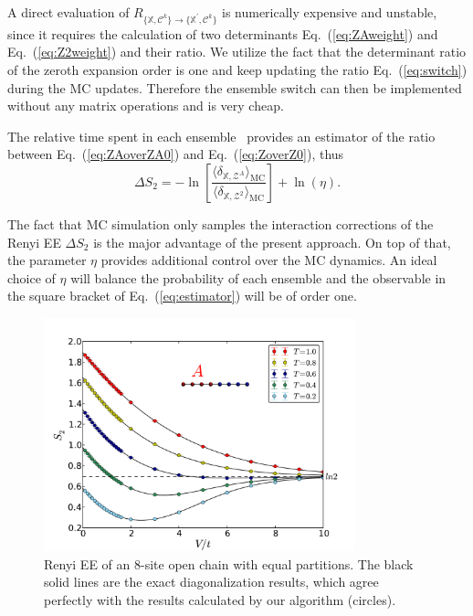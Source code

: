\documentclass[12pt,onecolumn,english,prl,showpacs,nofootinbib]{revtex4-1}
\begin{document}
A direct evaluation of $R_{\{\mathbb{X}, \mathcal{C}^{k}\} \rightarrow \{\mathbb{X}^{\prime}, \mathcal{C}^{k}\}}$ is numerically expensive and unstable, since it requires the calculation of two determinants Eq.~(\ref{eq:ZAweight}) and Eq.~(\ref{eq:Z2weight}) and their ratio. We utilize the fact that the determinant ratio of the zeroth expansion order is one and keep updating the ratio Eq.~(\ref{eq:switch}) during the MC updates. Therefore the ensemble switch can then be implemented without any matrix operations and is very cheap. 

The relative time spent in each ensemble~\cite{Humeniuk:2012cq}  provides an estimator of the ratio between Eq.~(\ref{eq:ZAoverZA0}) and Eq.~(\ref{eq:ZoverZ0}), thus 
\begin{equation}
\Delta S_{2} = -\ln\left [\frac{\langle \delta_{\mathbb{X},\mathcal{Z}^{A}} \rangle_\mathrm{MC}}{ \langle \delta _{\mathbb{X}, \mathcal{Z}^{2}} \rangle_\mathrm{MC}} \right ] + \ln(\eta).
\label{eq:estimator}
\end{equation}

The fact that MC simulation only samples the interaction corrections of the Renyi EE $\Delta S_{2}$ is the major advantage of the present approach. On top of that, the parameter $\eta$ provides additional control over the MC dynamics. An ideal choice of $\eta$ will balance the probability of each ensemble and the observable in the square bracket of Eq.~(\ref{eq:estimator}) will be of order one. 



\begin{figure}[t]
\centering
\includegraphics[width=9cm]{benchmark.pdf}
\caption{Renyi EE of an $8$-site open chain with equal partitions. The black solid lines are the exact diagonalization results, which agree perfectly with the results calculated by our algorithm (circles).}
\label{fig:1dbenchmark}
\end{figure}
\end{document}

